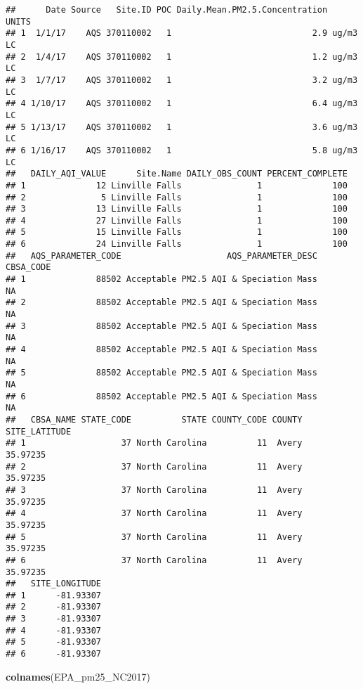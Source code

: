 \documentclass[]{article}
\newenvironment{Shaded}{\begin{snugshade}}{\end{snugshade}}
\newcommand{\KeywordTok}[1]{\textcolor[rgb]{0.13,0.29,0.53}{\textbf{#1}}}
\newcommand{\NormalTok}[1]{#1}
\begin{document}
\begin{verbatim}
##      Date Source   Site.ID POC Daily.Mean.PM2.5.Concentration    UNITS
## 1  1/1/17    AQS 370110002   1                            2.9 ug/m3 LC
## 2  1/4/17    AQS 370110002   1                            1.2 ug/m3 LC
## 3  1/7/17    AQS 370110002   1                            3.2 ug/m3 LC
## 4 1/10/17    AQS 370110002   1                            6.4 ug/m3 LC
## 5 1/13/17    AQS 370110002   1                            3.6 ug/m3 LC
## 6 1/16/17    AQS 370110002   1                            5.8 ug/m3 LC
##   DAILY_AQI_VALUE      Site.Name DAILY_OBS_COUNT PERCENT_COMPLETE
## 1              12 Linville Falls               1              100
## 2               5 Linville Falls               1              100
## 3              13 Linville Falls               1              100
## 4              27 Linville Falls               1              100
## 5              15 Linville Falls               1              100
## 6              24 Linville Falls               1              100
##   AQS_PARAMETER_CODE                     AQS_PARAMETER_DESC CBSA_CODE
## 1              88502 Acceptable PM2.5 AQI & Speciation Mass        NA
## 2              88502 Acceptable PM2.5 AQI & Speciation Mass        NA
## 3              88502 Acceptable PM2.5 AQI & Speciation Mass        NA
## 4              88502 Acceptable PM2.5 AQI & Speciation Mass        NA
## 5              88502 Acceptable PM2.5 AQI & Speciation Mass        NA
## 6              88502 Acceptable PM2.5 AQI & Speciation Mass        NA
##   CBSA_NAME STATE_CODE          STATE COUNTY_CODE COUNTY SITE_LATITUDE
## 1                   37 North Carolina          11  Avery      35.97235
## 2                   37 North Carolina          11  Avery      35.97235
## 3                   37 North Carolina          11  Avery      35.97235
## 4                   37 North Carolina          11  Avery      35.97235
## 5                   37 North Carolina          11  Avery      35.97235
## 6                   37 North Carolina          11  Avery      35.97235
##   SITE_LONGITUDE
## 1      -81.93307
## 2      -81.93307
## 3      -81.93307
## 4      -81.93307
## 5      -81.93307
## 6      -81.93307
\end{verbatim}

\begin{Shaded}
\begin{Highlighting}[]
\KeywordTok{colnames}\NormalTok{(EPA_pm25_NC2017)}
\end{Highlighting}
\end{Shaded}
\end{document}
